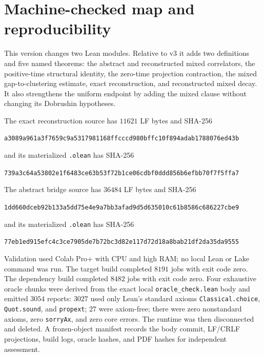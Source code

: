 \documentclass[11pt]{article}
\theoremstyle{definition}
\theoremstyle{remark}
\newcommand{\lean}[1]{\nolinkurl{#1}}
\newcommand{\ModuleHash}{\nolinkurl{a3089a961a3f7659c9a5317981168ffcccd980bffc10f894adab1788076ed43b}}
\newcommand{\OleanHash}{\nolinkurl{739a3c64a53802e1f6483ce63b53f72b1ce06cdbf0ddd856b6efbb70f7f5ffa7}}
\newcommand{\BridgeHash}{\nolinkurl{1dd660dceb92b133a5dd75e4e9a7bb3afad9d5d635010c61b8586c686227cbe9}}
\newcommand{\BridgeOleanHash}{\nolinkurl{77eb1ed915efc4c3ce7905de7b72bc3d82e117d72d18a8bab21df2da35da9555}}
\begin{document}
\section{Machine-checked map and reproducibility}

This version changes two Lean modules.  Relative to v3 it adds two definitions
and five named theorems: the abstract and reconstructed mixed correlators, the
positive-time structural identity, the zero-time projection contraction, the
mixed gap-to-clustering estimate, exact reconstruction, and reconstructed
mixed decay.  It also strengthens the uniform endpoint by adding the mixed
clause without changing its Dobrushin hypotheses.

The exact reconstruction source has $11621$ LF bytes and SHA-256
\begin{center}\ModuleHash\end{center}
and its materialized \texttt{.olean} has SHA-256
\begin{center}\OleanHash\end{center}
The abstract bridge source has $36484$ LF bytes and SHA-256
\begin{center}\BridgeHash\end{center}
and its materialized \texttt{.olean} has SHA-256
\begin{center}\BridgeOleanHash\end{center}

Validation used Colab Pro+ with CPU and high RAM; no local Lean or Lake command
was run.  The target build completed $8191$ jobs with exit code zero.  The
dependency build completed $8482$ jobs with exit code zero.  Four exhaustive
oracle chunks were derived from the exact local \texttt{oracle\_check.lean}
body and emitted $3054$ reports: $3027$ used only Lean's standard axioms
\lean{Classical.choice}, \lean{Quot.sound}, and \lean{propext}; $27$ were
axiom-free; there were zero nonstandard axioms, zero \lean{sorryAx}, and zero
core errors.  The runtime was then disconnected and deleted.  A frozen-object
manifest records the body commit, LF/CRLF projections, build logs, oracle
hashes, and PDF hashes for independent assessment.
\end{document}
